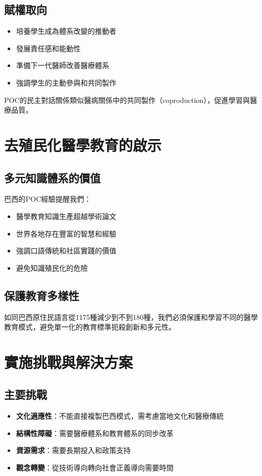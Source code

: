 \documentclass[12pt,a4paper]{article}
\newcommand{\note}[1]{
    \par
    \noindent
    \begin{tcolorbox}[
        colback=brazil_blue!5!white,
        colframe=brazil_blue,
        title=\textbf{重點提醒},
        fonttitle=\bfseries,
        boxrule=0.5pt,
        arc=3pt,
        left=6pt,
        right=6pt,
        top=6pt,
        bottom=6pt
    ]
    #1
    \end{tcolorbox}
}
\begin{document}
\subsection{賦權取向}
\begin{itemize}[nosep]
    \item 培養學生成為體系改變的推動者
    \item 發展責任感和能動性
    \item 準備下一代醫師改善醫療體系
    \item 強調學生的主動參與和共同製作
\end{itemize}

\vspace{0.5cm}
\note{
POC的民主對話關係類似醫病關係中的共同製作（coproduction），促進學習與醫療品質。
}

\section{去殖民化醫學教育的啟示}

\subsection{多元知識體系的價值}
巴西的POC經驗提醒我們：
\begin{itemize}[nosep]
    \item 醫學教育知識生產超越學術論文
    \item 世界各地存在豐富的智慧和經驗
    \item 強調口語傳統和社區實踐的價值
    \item 避免知識殖民化的危險
\end{itemize}

\subsection{保護教育多樣性}
如同巴西原住民語言從1175種減少到不到180種，我們必須保護和學習不同的醫學教育模式，避免單一化的教育標準扼殺創新和多元性。

\section{實施挑戰與解決方案}

\subsection{主要挑戰}
\begin{itemize}[nosep]
    \item \textbf{文化適應性}：不能直接複製巴西模式，需考慮當地文化和醫療傳統
    \item \textbf{結構性障礙}：需要醫療體系和教育體系的同步改革
    \item \textbf{資源需求}：需要長期投入和政策支持
    \item \textbf{觀念轉變}：從技術導向轉向社會正義導向需要時間
\end{itemize}
\end{document}
